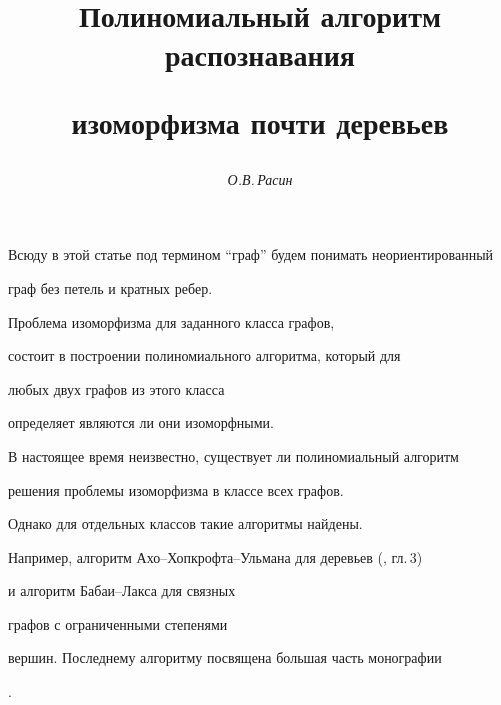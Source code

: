 \author{\it О.В.\,Расин}




\title{Полиномиальный алгоритм распознавания


изоморфизма почти деревьев}





\date{}




\pagestyle{plain} %







\maketitle


\label{begin}











Всюду в этой статье под термином ``граф'' будем понимать неориентированный


граф без петель и кратных ребер.


Проблема изоморфизма для заданного класса графов,


состоит в построении полиномиального алгоритма, который для


любых двух графов из этого класса


определяет являются ли они изоморфными.


В настоящее время неизвестно, существует ли полиномиальный алгоритм


решения проблемы изоморфизма в классе всех графов.


Однако для отдельных классов такие алгоритмы найдены.


Например, алгоритм Ахо--Хопкрофта--Ульмана для деревьев (\cite{Aho}, гл.\,3)


и алгоритм Бабаи--Лакса для связных


графов с ограниченными степенями


вершин. Последнему алгоритму посвящена большая часть монографии


\cite{Hoffmann}.






